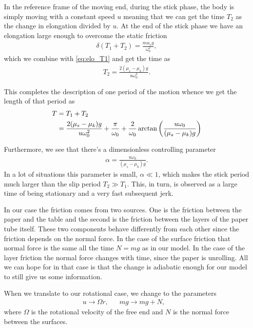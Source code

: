 \documentclass[10pt,a4paper,twocolumn]{article}
\begin{document}
In the reference frame of the moving end, during the stick phase, the body is simply moving with a constant speed $u$ meaning that we can get the time $T_2$ as the change in elongation divided by $u$. At the end of the stick phase we have an elongation large enough to overcome the static friction
%
\begin{align}
    \delta(T_1 + T_2) = \frac{mu_s g}{\omega_0^2},
\end{align}
%
which we combine with \cref{eq:elo_T1} and get the time as
%
\begin{align}
    T_2 = \frac{2 (\mu_s - \mu_k) g}{u \omega_0^2}.
\end{align}

This completes the description of one period of the motion whence we get the length of that period as
%
\begin{align}
    T &= T_1 + T_2 \notag\\
    &= \frac{2 (\mu_s - \mu_k) g}{u \omega_0^2} + \frac{\pi}{\omega_0} + \frac{2}{\omega_0} \arctan \left( \frac{u \omega_0}{(\mu_s - \mu_k) g} \right)
\end{align}

Furthermore, we see that there's a dimensionless controlling parameter
%
\begin{align}
    \alpha = \frac{u \omega_0}{(\mu_s - \mu_k) g}.
\end{align}
%
In a lot of situations this parameter is small, $\alpha \ll 1$, which makes the stick period much larger than the slip period $T_2 \gg T_1$. This, in turn, is observed as a large time of being stationary and a very fast subsequent jerk.

In our case the friction comes from two sources. One is the friction between the paper and the table and the second is the friction between the layers of the paper tube itself. These two components behave differently from each other since the friction depends on the normal force. In the case of the surface friction that normal force is the same all the time $N=mg$ as in our model. In the case of the layer friction the normal force changes with time, since the paper is unrolling. All we can hope for in that case is that the change is adiabatic enough for our model to still give us some information.

When we translate to our rotational case, we change to the parameters
%
\begin{align}
    u \rightarrow \Omega r,& &mg \rightarrow mg + N,&
\end{align}
%
where $\Omega$ is the rotational velocity of the free end and $N$ is the normal force between the surfaces.











\nocite{oregon}
\nocite{Prior1719}


\printbibliography
\end{document}
